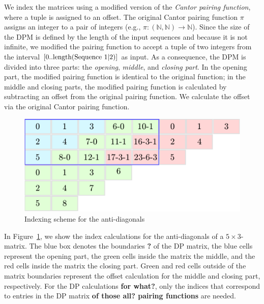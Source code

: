 \documentclass[runningheads,a4paper]{llncs}
\begin{document}
We index the matrices using a modified version of the \textit{Cantor pairing function}, where a tuple is assigned to an offset. 
The original Cantor pairing function $\pi$ assigns an integer to a pair of integers (e.g., $\pi: (\mathbb{N}, \mathbb{N}) \rightarrow \mathbb{N}$). 
Since the size of the DPM is defined by the length of the input sequences and because it is not infinite, 
we modified the pairing function to accept a tuple of two integers from the interval $[0..\textrm{length}(\textrm{Sequence 1\textbar2})]$ as input. 
As a consequence, the DPM is divided into three parts: the \emph{opening}, \emph{middle}, and \emph{closing part}. 
In the opening part, the modified pairing function is identical to the original function; in the middle and closing parts, 
the modified pairing function is calculated by subtracting an offset from the original pairing function. 
We calculate the offset via the original Cantor pairing function.

\begin{figure}[ht!]
  \centering
  \includegraphics[scale=0.9]{figures/pairingfunc.pdf}
  \caption{Indexing scheme for the anti-diagonals}
  \label{fig:pairingfunc}
\end{figure}

In Figure~\ref{fig:pairingfunc}, we show the index calculations for the anti-diagonals of a $5\times3$-matrix. 
The blue box denotes the boundaries {\bf ?} of the DP matrix, the blue cells represent the opening part, 
the green cells inside the matrix the middle, and the red cells inside the matrix the closing part. 
Green and red cells outside of the matrix boundaries represent the offset calculation for the middle and closing part, respectively. 
For the DP calculations {\bf for what?}, only the indices that correspond to
entries in the DP matrix  {\bf of those {\bf all?} pairing functions} are
needed. 
\end{document}
